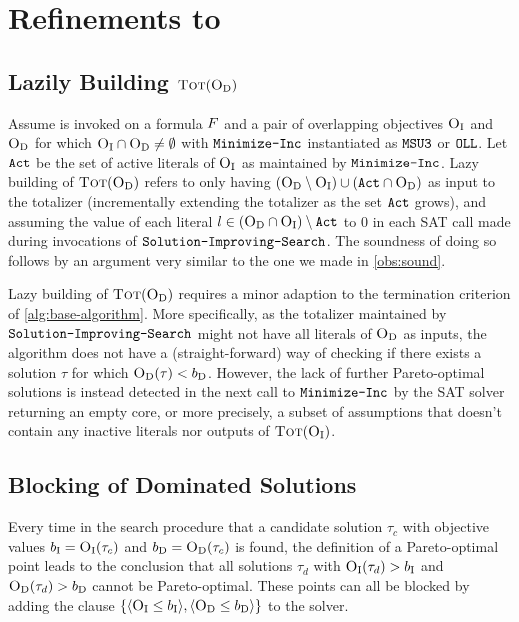 \section{Refinements to \algname{}\label{sec:refinements}}

\subsection{Lazily Building $\textsc{Tot}(\textsc{O}_{\text{D}})$}

Assume \algname{} is invoked on a formula $F$ and a pair of overlapping objectives $\textsc{O}_{\text{I}}$ and $\textsc{O}_{\text{D}}$ for which $\textsc{O}_{\text{I}} \cap \textsc{O}_{\text{D}} \neq \emptyset$ with $\texttt{Minimize-\allowbreak{}Inc}$ instantiated as $\texttt{MSU3}$ or $\texttt{OLL}$. Let $\texttt{Act}$ be the set of active literals of $\textsc{O}_{\text{I}}$ as maintained by $\texttt{Minimize-\allowbreak{}Inc}$.
Lazy building of $\textsc{Tot}(\textsc{O}_{\text{D}})$ refers to only having $(\textsc{O}_{\text{D}} \setminus \textsc{O}_{\text{I}}) \cup  (\texttt{Act} \cap \textsc{O}_{\text{D}})$ as input to the totalizer (incrementally extending the totalizer as the set $\texttt{Act}$ grows), and assuming the value of each literal $l \in (\textsc{O}_{\text{D}} \cap \textsc{O}_{\text{I}}) \setminus \texttt{Act}$ to $0$ in each SAT call made during invocations of $\texttt{Solution-\allowbreak{}Improving-\allowbreak{}Search}$.
The soundness of doing so follows by an argument very similar to the one we made in \cref{obs:sound}.

Lazy building of $\textsc{Tot}(\textsc{O}_{\text{D}})$ requires a minor adaption to the termination criterion of \cref{alg:base-algorithm}.
More specifically, as the totalizer maintained by $\texttt{Solution-\allowbreak{}Improving-\allowbreak{}Search}$ might not have all literals of $\textsc{O}_{\text{D}}$ as inputs, the algorithm does not have a (straight-forward) way of checking if there exists a solution $\tau$ for which $\textsc{O}_{\text{D}}(\tau) < b_{\text{D}}$.
However, the lack of further Pareto-optimal solutions is instead detected in the next call to $\texttt{Minimize-\allowbreak{}Inc}$ by the SAT solver returning an empty core, or more precisely, a subset of assumptions that doesn't contain any inactive literals nor outputs of $\textsc{Tot}(\textsc{O}_{\text{I}})$.

\subsection{Blocking of Dominated Solutions}

Every time in the search procedure that a candidate solution $\tau_c$ with objective values $b_{\text{I}} = \textsc{O}_{\text{I}}(\tau_c)$ and $b_{\text{D}} = \textsc{O}_{\text{D}}(\tau_c)$ is found, the definition of a Pareto-optimal point leads to the conclusion that all solutions $\tau_d$ with $\textsc{O}_{\text{I}}(\tau_d) > b_{\text{I}}$ and $\textsc{O}_{\text{D}}(\tau_d) > b_{\text{D}}$ cannot be Pareto-optimal.
These points can all be blocked by adding the clause $\{ \langle \textsc{O}_{\text{I}} \leq b_{\text{I}} \rangle, \langle \textsc{O}_{\text{D}} \leq b_{\text{D}} \rangle \}$ to the solver.

